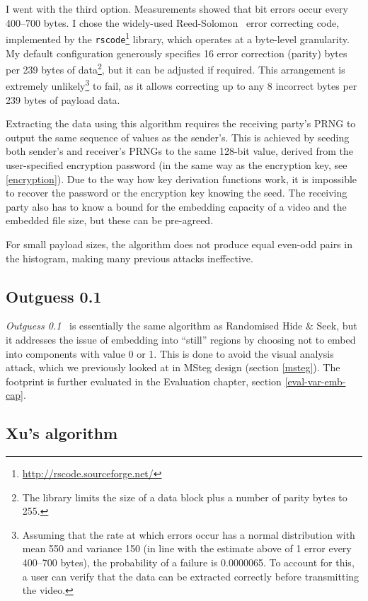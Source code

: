\documentclass[12pt,british,twoside,notitlepage,usenames,dvipsnames,hypens,final]{report}
\numberwithin{equation}{section}
\numberwithin{figure}{section}
\begin{document}
I went with the third option. Measurements showed that bit errors occur every 400--700 bytes. I chose the widely-used Reed-Solomon~\cite{clarke2002reed} error correcting code, implemented by the \texttt{rscode}\footnote{\url{http://rscode.sourceforge.net/}} library, which operates at a byte-level granularity. My default configuration generously specifies 16 error correction (parity) bytes per 239 bytes of data\footnote{The library limits the size of a data block plus a number of parity bytes to 255.}, but it can be adjusted if required. This arrangement is extremely unlikely\footnote{Assuming that the rate at which errors occur has a normal distribution with mean 550 and variance 150 (in line with the estimate above of 1 error every 400--700 bytes), the probability of a failure is 0.0000065. To account for this, a user can verify that the data can be extracted correctly before transmitting the video.} to fail, as it allows correcting up to any 8 incorrect bytes per 239 bytes of payload data.

Extracting the data using this algorithm requires the receiving party's PRNG to output the same sequence of values as the sender's. This is achieved by seeding both sender's and receiver's PRNGs to the same 128-bit value, derived from the user-specified encryption password (in the same way as the encryption key, see \ref{encryption}). Due to the way how key derivation functions work, it is impossible to recover the password or the encryption key knowing the seed. The receiving party also has to know a bound for the embedding capacity of a video and the embedded file size, but these can be pre-agreed.

For small payload sizes, the algorithm does not produce equal even-odd pairs in the histogram, making many previous attacks ineffective.

\subsection{Outguess 0.1}
\label{outguess1}

\emph{Outguess 0.1}~\cite{bateman} is essentially the same algorithm as Randomised Hide \& Seek, but it addresses the issue of embedding into ``still'' regions by choosing not to embed into components with value 0 or 1. This is done to avoid the visual analysis attack, which we previously looked at in MSteg design (section \ref{msteg}). The footprint is further evaluated in the Evaluation chapter, section \ref{eval-var-emb-cap}.

\subsection{Xu's algorithm}
\label{xu-alg}
\end{document}
